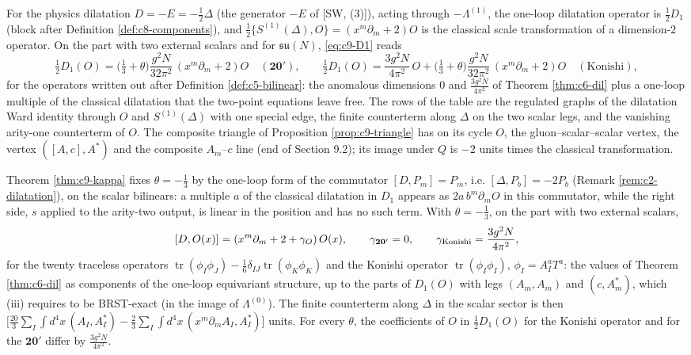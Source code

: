 \begin{remark}
For the physics dilatation $D=-E=-\tfrac12\Delta$ (the generator $-E$ of [SW, (3)]), acting through $-\Lambda^{(1)}$, the one-loop dilatation operator is $\tfrac12D_1$ (block after Definition \ref{def:c8-components}), and $\tfrac12\{S^{(1)}(\Delta),O\}=(x^m\partial_m+2)O$ is the classical scale transformation of a dimension-$2$ operator. On the part with two external scalars and for $\mathfrak{su}(N)$, \eqref{eq:c9-D1} reads
\[
\tfrac12D_1(O)=\Big(\tfrac13+\theta\Big)\frac{g^2N}{32\pi^2}\,(x^m\partial_m+2)O\quad(\mathbf{20'}),\qquad \tfrac12D_1(O)=\frac{3g^2N}{4\pi^2}\,O+\Big(\tfrac13+\theta\Big)\frac{g^2N}{32\pi^2}\,(x^m\partial_m+2)O\quad(\text{Konishi}),
\]
for the operators written out after Definition \ref{def:c5-bilinear}: the anomalous dimensions $0$ and $\tfrac{3g^2N}{4\pi^2}$ of Theorem \ref{thm:c6-dil} plus a one-loop multiple of the classical dilatation that the two-point equations leave free. The rows of the table are the regulated graphs of the dilatation Ward identity through $O$ and $S^{(1)}(\Delta)$ with one special edge, the finite counterterm along $\Delta$ on the two scalar legs, and the vanishing arity-one counterterm of $O$. The composite triangle of Proposition \ref{prop:c9-triangle} has on its cycle $O$, the gluon--scalar--scalar vertex, the vertex $([A,c],A^*)$ and the composite $A_m$--$c$ line (end of Section 9.2); its image under $Q$ is $-2$ units times the classical transformation.
\end{remark}

\begin{remark}
Theorem \ref{thm:c9-kappa} fixes $\theta=-\tfrac13$ by the one-loop form of the commutator $[D,P_m]=P_m$, i.e. $[\Delta,P_b]=-2P_b$ (Remark \ref{rem:c2-dilatation}), on the scalar bilinears: a multiple $a$ of the classical dilatation in $D_1$ appears as $2a\,b^m\partial_mO$ in this commutator, while the right side, $s$ applied to the arity-two output, is linear in the position and has no such term. With $\theta=-\tfrac13$, on the part with two external scalars,
\[
[D,O(x)]=(x^m\partial_m+2+\gamma_O)\,O(x),\qquad \gamma_{\mathbf{20'}}=0,\qquad \gamma_{\rm Konishi}=\frac{3g^2N}{4\pi^2},
\]
for the twenty traceless operators $\operatorname{tr}(\phi_I\phi_J)-\tfrac16\delta_{IJ}\operatorname{tr}(\phi_K\phi_K)$ and the Konishi operator $\operatorname{tr}(\phi_I\phi_I)$, $\phi_I=A^a_IT^a$: the values of Theorem \ref{thm:c6-dil} as components of the one-loop equivariant structure, up to the parts of $D_1(O)$ with legs $(A_m,A_m)$ and $(c,A^*_m)$, which (iii) requires to be BRST-exact (in the image of $\Lambda^{(0)}$). The finite counterterm along $\Delta$ in the scalar sector is then $\big[\tfrac{20}3\sum_I\int d^4x\,(A_I,A^*_I)-\tfrac23\sum_I\int d^4x\,(x^m\partial_mA_I,A^*_I)\big]$ units. For every $\theta$, the coefficients of $O$ in $\tfrac12D_1(O)$ for the Konishi operator and for the $\mathbf{20'}$ differ by $\tfrac{3g^2N}{4\pi^2}$.
\end{remark}

